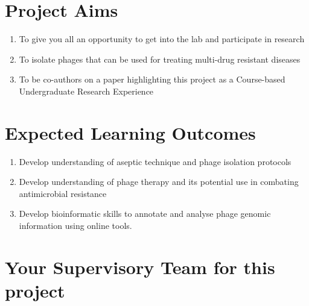 \documentclass[
]{book}
\providecommand{\tightlist}{%
  \setlength{\itemsep}{0pt}\setlength{\parskip}{0pt}}
\begin{document}
\hypertarget{project-aims}{%
\section*{Project Aims}\label{project-aims}}

\begin{enumerate}
\def\labelenumi{\arabic{enumi}.}
\tightlist
\item
  To give you all an opportunity to get into the lab and participate in research
\item
  To isolate phages that can be used for treating multi-drug resistant diseases
\item
  To be co-authors on a paper highlighting this project as a Course-based Undergraduate Research Experience
\end{enumerate}

\hypertarget{expected-learning-outcomes}{%
\section*{Expected Learning Outcomes}\label{expected-learning-outcomes}}

\begin{enumerate}
\def\labelenumi{\arabic{enumi}.}
\tightlist
\item
  Develop understanding of aseptic technique and phage isolation protocols
\item
  Develop understanding of phage therapy and its potential use in combating antimicrobial resistance
\item
  Develop bioinformatic skills to annotate and analyse phage genomic information using online tools.
\end{enumerate}

\hypertarget{your-supervisory-team-for-this-project}{%
\section*{Your Supervisory Team for this project}\label{your-supervisory-team-for-this-project}}
\end{document}
